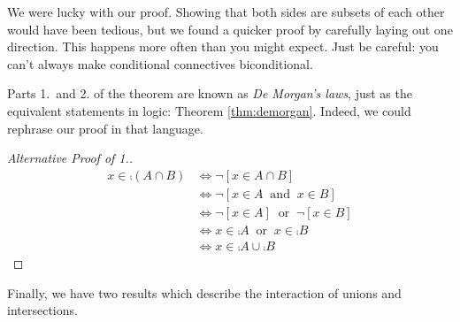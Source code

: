 We were lucky with our proof. Showing that both sides are subsets of each other would have been tedious, but we found a quicker proof by carefully laying out one direction. This happens more often than you might expect. Just be careful: you can't always make conditional connectives biconditional.\par

 Parts 1.\ and 2. of the theorem are known as \emph{De Morgan's laws}, just as the equivalent statements in logic: Theorem \ref{thm:demorgan}. Indeed, we could rephrase our proof in that language.

\begin{proof}[Alternative Proof of 1.]
\begin{align*}
x\in\comp{(A\cap B)}&\iff \neg[x\in A\cap B]\\
&\iff \neg[x\in A\ \text{ and }\  x\in B]\\
&\iff \neg[x\in A]\ \text{ or }\ \neg[x\in B]\tag*{(De Morgan's first law)}\\
&\iff x\in\comp A\ \text{ or }\ x\in\comp B\\
&\iff x\in\comp A\cup\comp B\tag*{\qedhere}
\end{align*}
\end{proof}

Finally, we have two results which describe the interaction of unions and intersections.\par

